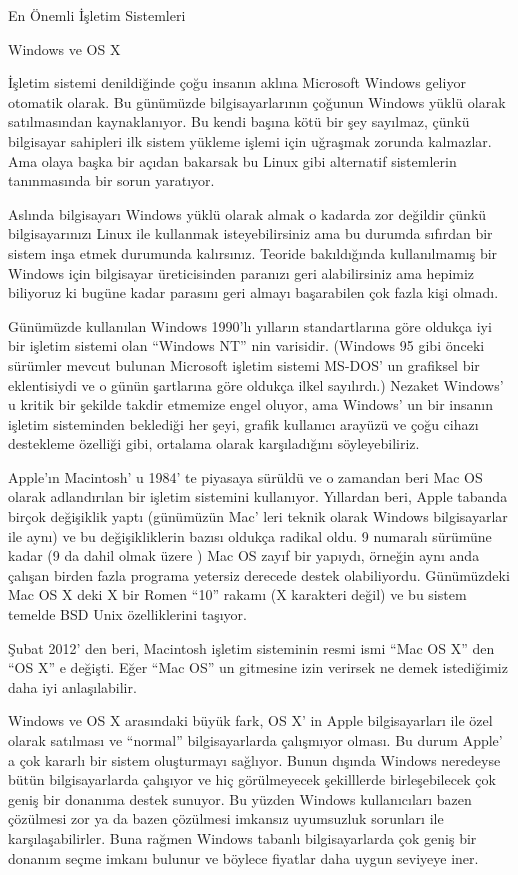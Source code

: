 \documentclass[10pt,a5paper]{book}
\begin{document}
\begin{section}{En Önemli İşletim Sistemleri}
\begin{subsection}{Windows ve OS X}

İşletim sistemi denildiğinde çoğu insanın aklına Microsoft Windows geliyor otomatik olarak. Bu günümüzde bilgisayarlarının çoğunun Windows yüklü olarak satılmasından kaynaklanıyor. Bu kendi başına kötü bir şey sayılmaz, çünkü bilgisayar sahipleri ilk sistem yükleme işlemi için uğraşmak zorunda kalmazlar. Ama olaya başka bir açıdan bakarsak bu Linux gibi alternatif sistemlerin tanınmasında bir sorun yaratıyor.

Aslında bilgisayarı Windows yüklü olarak almak o kadarda zor değildir çünkü bilgisayarınızı Linux ile kullanmak isteyebilirsiniz ama bu durumda sıfırdan bir sistem inşa etmek durumunda kalırsınız. Teoride bakıldığında kullanılmamış bir Windows için bilgisayar üreticisinden paranızı geri alabilirsiniz ama hepimiz biliyoruz ki bugüne kadar parasını geri almayı başarabilen çok fazla kişi olmadı.

Günümüzde kullanılan Windows 1990'lı yılların standartlarına göre oldukça iyi bir işletim sistemi olan “Windows NT” nin  varisidir. (Windows 95 gibi önceki sürümler mevcut bulunan Microsoft işletim sistemi MS-DOS' un grafiksel bir eklentisiydi ve o günün şartlarına göre oldukça ilkel sayılırdı.) Nezaket Windows' u kritik bir şekilde takdir etmemize engel oluyor, ama Windows' un bir insanın işletim sisteminden beklediği her şeyi, grafik kullanıcı arayüzü ve çoğu cihazı destekleme özelliği gibi, ortalama olarak karşıladığını söyleyebiliriz.

Apple’ın Macintosh' u 1984' te piyasaya sürüldü ve o zamandan beri Mac OS olarak adlandırılan bir işletim sistemini kullanıyor. Yıllardan beri, Apple tabanda birçok değişiklik yaptı (günümüzün Mac' leri teknik olarak Windows bilgisayarlar ile aynı) ve bu değişikliklerin bazısı oldukça radikal oldu. 9 numaralı sürümüne kadar (9 da dahil olmak üzere ) Mac OS zayıf bir yapıydı, örneğin aynı anda çalışan birden fazla programa yetersiz derecede destek olabiliyordu. Günümüzdeki Mac OS X deki X bir Romen “10” rakamı (X karakteri değil) ve bu sistem temelde BSD Unix özelliklerini taşıyor.

Şubat 2012' den beri, Macintosh işletim sisteminin resmi ismi “Mac OS X” den “OS X” e değişti. Eğer “Mac OS” un gitmesine izin verirsek ne demek istediğimiz daha iyi anlaşılabilir.

Windows ve OS X arasındaki büyük fark, OS X' in Apple bilgisayarları ile özel olarak satılması ve “normal” bilgisayarlarda çalışmıyor olması. Bu durum Apple' a çok kararlı bir sistem oluşturmayı sağlıyor. Bunun dışında Windows neredeyse bütün bilgisayarlarda çalışıyor ve hiç görülmeyecek şekilllerde birleşebilecek çok geniş bir donanıma destek sunuyor. Bu yüzden Windows kullanıcıları bazen çözülmesi zor ya da bazen çözülmesi imkansız uyumsuzluk sorunları ile karşılaşabilirler.  Buna rağmen Windows tabanlı bilgisayarlarda çok geniş bir donanım seçme imkanı bulunur ve böylece fiyatlar daha uygun seviyeye iner.


\end{subsection}
\end{section}
\end{document}
